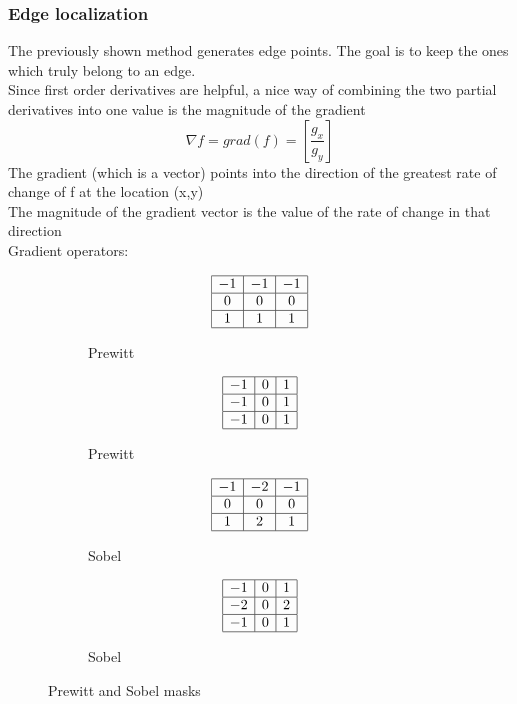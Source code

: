 \subsubsection{Edge localization}
The previously shown method generates edge points. The goal is to keep the ones which truly belong to an edge.\\
Since first order derivatives are helpful, a nice way of combining the two partial derivatives into one value is the magnitude of the gradient
\[
	\nabla f = grad(f) = \left[\frac{g_x}{g_y}\right]
\]
The gradient (which is a vector) points into the direction of the greatest rate of change of f at the location (x,y)\\
The magnitude of the gradient vector is the value of the rate of change in that direction\\
Gradient operators:\\
\begin{figure}[h]
	\centering
	\begin{subfigure}[b]{0.2\textwidth}
		\centering
		\[
		\begin{array}{|c|c|c|}
			\hline
			-1 & -1 & -1\\
			\hline
			0 & 0 & 0\\
			\hline
			1 & 1 & 1\\
			\hline
		\end{array}
		\]
		\caption{Prewitt}
	\end{subfigure}
	\begin{subfigure}[b]{0.2\textwidth}
		\centering
		\[
		\begin{array}{|c|c|c|}
			\hline
			-1 & 0 & 1\\
			\hline
			-1 & 0 & 1\\
			\hline
			-1 & 0 & 1\\
			\hline
		\end{array}
		\]
		\caption{Prewitt}
	\end{subfigure}
	\begin{subfigure}[b]{0.2\textwidth}
		\centering
		\[
		\begin{array}{|c|c|c|}
			\hline
			-1 & -2 & -1\\
			\hline
			0 & 0 & 0\\
			\hline
			1 & 2 & 1\\
			\hline
		\end{array}
		\]
		\caption{Sobel}
	\end{subfigure}
	\begin{subfigure}[b]{0.2\textwidth}
		\centering
		\[
		\begin{array}{|c|c|c|}
			\hline
			-1 & 0 & 1\\
			\hline
			-2 & 0 & 2\\
			\hline
			-1 & 0 & 1\\
			\hline
		\end{array}
		\]
		\caption{Sobel}
	\end{subfigure}
	\caption{Prewitt and Sobel masks}
\end{figure}\\
